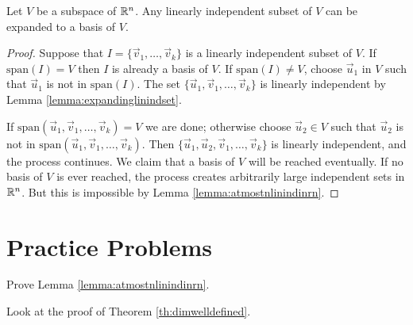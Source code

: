 \documentclass{ximera}
\begin{document}
\begin{theorem}\label{th:expandtobasis}
Let $V$ be a subspace of $\mathbb{R}^n$.  Any linearly independent subset of $V$ can be expanded to a basis of $V$.
\end{theorem}
\begin{proof}
Suppose that $I=\{\vec{v}_1,\ldots ,\vec{v}_k\}$ is a linearly independent subset of $V$. If $\mbox{span}(I) = V$ then $I$ is already a basis of $V$. If $\mbox{span}(I) \neq V$, choose $\vec{u}_1$ in $V$ such that $\vec{u}_1$ is not in $\mbox{span}(I)$. The set $\{\vec{u}_1, \vec{v}_1,\ldots ,\vec{v}_k\}$ is linearly independent by Lemma \ref{lemma:expandinglinindset}. 

If $\mbox{span}(\vec{u}_1, \vec{v}_1,\ldots ,\vec{v}_k) = V$ we are done; otherwise choose $\vec{u}_{2} \in V$ such that $\vec{u}_{2}$ is not in $\mbox{span}(\vec{u}_1, \vec{v}_1,\ldots ,\vec{v}_k)$. Then $\{\vec{u}_1,\vec{u}_2, \vec{v}_1,\ldots ,\vec{v}_k\}$ is linearly independent, and the process continues. We claim that a basis of $V$ will be reached eventually. If no basis of $V$ is ever reached, the process creates arbitrarily large independent sets in $\mathbb{R}^n$. But this is impossible by Lemma \ref{lemma:atmostnlinindinrn}.
\end{proof}

\section*{Practice Problems}
\begin{problem}\label{prob:atmostnlinindinrnproof}
Prove Lemma \ref{lemma:atmostnlinindinrn}.
\begin{hint}
Look at the proof of Theorem \ref{th:dimwelldefined}.
\end{hint}
\end{problem}
\end{document}
